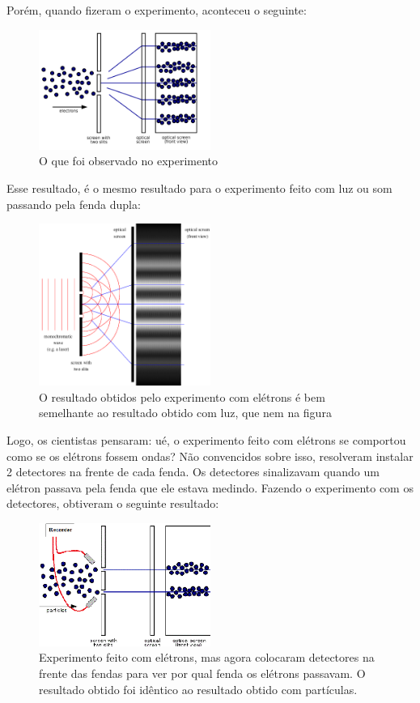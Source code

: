 \documentclass[12pt]{extarticle}
\newcommand{\<}{\langle}
\renewcommand{\>}{\rangle}
\theoremstyle{definition}
\begin{document}
Porém, quando fizeram o experimento, aconteceu o seguinte:
\begin{figure}[H]
    \centering
    \includegraphics[width=0.5\textwidth]{Double-Slit-Experiment-Results.png}
    \caption{O que foi observado no experimento}
    \label{fig:results}
\end{figure}

Esse resultado, é o mesmo resultado para o experimento feito com luz ou som passando pela fenda dupla: 
\begin{figure}[H]
    \centering
    \includegraphics[width=0.5\textwidth]{light_double_slit.png}
    \caption{O resultado obtidos pelo experimento com elétrons é bem semelhante ao resultado obtido com luz, que nem na figura}
    \label{fig:light_double_slit}
\end{figure}

Logo, os cientistas pensaram: ué, o experimento feito com elétrons se comportou como se os elétrons fossem ondas? Não convencidos sobre isso, resolveram instalar 2 detectores na frente de cada fenda. Os detectores sinalizavam quando um elétron passava pela fenda que ele estava medindo. Fazendo o experimento com os detectores, obtiveram o seguinte resultado:
\begin{figure}[H]
    \centering
    \includegraphics[width=0.5\textwidth]{Two-slit-experiment-with-detector.png}
    \caption{Experimento feito com elétrons, mas agora colocaram detectores na frente das fendas para ver por qual fenda os elétrons passavam. O resultado obtido foi idêntico ao resultado obtido com partículas.}
    \label{fig:detector_double_slit}
\end{figure}
\end{document}
